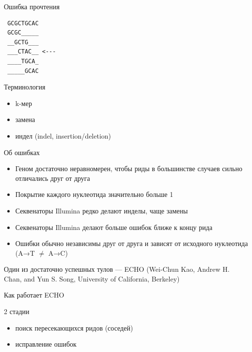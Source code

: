 \documentclass[10pt]{beamer}
\begin{document}
\begin{frame}[fragile]{Ошибка прочтения}
\begin{verbatim}
 GCGCTGCAC
 GCGC_____
 __GCTG___
 ___CTAC__ <---
 ____TGCA_
 _____GCAC
\end{verbatim}
\end{frame}

\begin{frame}{Терминология}
  \begin{itemize}
  \item k-мер
  \item замена
  \item индел (indel, insertion/deletion)
  \end{itemize}
\end{frame}


\begin{frame}{Об ошибках}
  \begin{itemize}
  \item Геном достаточно неравномерен, чтобы риды в большинстве
    случаев сильно отличались друг от друга
  \item Покрытие каждого нуклеотида значительно больше 1
  \item Секвенаторы Illumina редко делают инделы, чаще замены
  \item Секвенаторы Illumina делают больше ошибок ближе к концу рида
  \item Ошибки обычно независимы друг от друга и зависят от исходного
    нуклеотида (A→T $\neq$ A→C)
  \end{itemize}
  Один из достаточно успешных тулов — ECHO (Wei-Chun Kao, Andrew
  H. Chan, and Yun S. Song, University of California, Berkeley)
\end{frame}


\begin{frame}
  \begin{center}
    \Large
    Как работает ECHO
  \end{center}
\end{frame}

\begin{frame}{2 стадии}
  \begin{itemize}
  \item поиск пересекающихся ридов (соседей)
  \item исправление ошибок
  \end{itemize}
\end{frame}
\end{document}

